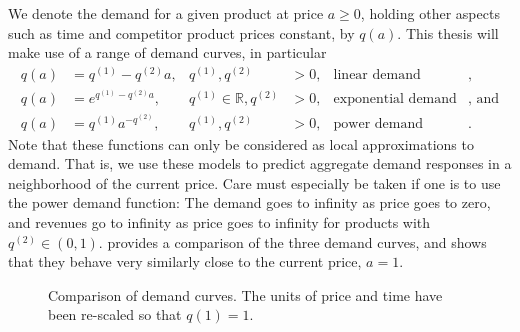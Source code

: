 \documentclass[main.tex]{subfiles}
\begin{document}
We denote the demand for a given product at price $a\geq 0$, holding
other aspects such as time and competitor product prices constant, by $q(a)$.
This thesis will make use of a range of demand curves, in particular
\begin{align}\label{eq:demand_fun_lin}
  q(a) &= q^{(1)}-q^{(2)}a,&q^{(1)},q^{(2)}&>0,&\text{linear demand}&,\\
  q(a) &= e^{q^{(1)}-q^{(2)}a},&q^{(1)}\in\mathbb{R},q^{(2)}&>0,&\text{exponential
                                                                  demand}&\text{, and}\\
  q(a) &= q^{(1)}a^{-q^{(2)}},&q^{(1)},q^{(2)}&>0,&\text{power demand}&.\label{eq:demand_fun_pow}
\end{align}
Note that these functions can only be considered as local
approximations to demand. That is, we use these models to predict
aggregate demand responses in a neighborhood of the current
price. Care must especially be taken if one is to use the power demand
function: The demand goes to infinity as price goes to zero, and
revenues go to infinity as price goes to infinity for products with $q^{(2)}\in(0,1)$.
 provides a comparison of the three
demand curves, and shows that they behave very similarly close to the
current price, $a=1$.
\begin{figure}[htbp]
  \centering
  \caption{Comparison of demand curves. The units of price and time
    have been re-scaled so that $q(1)=1$.}\label{fig:demandfun_comparison}
\end{figure}
\end{document}
